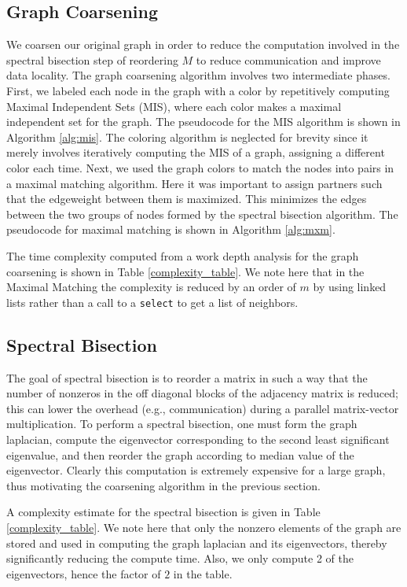 \documentclass[11pt]{article}
\begin{document}
\subsection{Graph Coarsening}

We coarsen our original graph in order to reduce the computation involved in
the spectral bisection step of reordering $M$ to reduce communication and improve data
locality.
The graph coarsening algorithm involves two intermediate phases. First, we
labeled each node in the graph with a color by repetitively computing Maximal
Independent Sets (MIS), where each color makes a maximal independent set for the
graph. The pseudocode for the MIS algorithm is shown in
Algorithm \ref{alg:mis}. The coloring algorithm is neglected for brevity since
it merely involves iteratively computing the MIS of a graph, assigning a
different color each time. Next, we used the
graph colors to match the nodes into pairs in a maximal matching algorithm. Here
it was important to assign partners such that the edgeweight between them is
maximized. This minimizes the edges between the two groups of nodes formed
by the spectral bisection algorithm. The pseudocode for maximal matching is
shown in Algorithm \ref{alg:mxm}. 

The time complexity computed from a work depth analysis for the graph coarsening is shown in Table
\ref{complexity_table}. We note here that in the Maximal Matching the
complexity is reduced by an order of $m$ by using linked lists rather than
a call to a \texttt{select} to get a list of neighbors. 

\subsection{Spectral Bisection}

The goal of spectral bisection is to reorder a matrix in such a way that the
number of nonzeros in the off diagonal blocks of the adjacency matrix is
reduced; this can lower the overhead (e.g., communication) during a parallel
matrix-vector multiplication. To perform a spectral bisection, one must form the
graph laplacian, compute the eigenvector corresponding to the second least significant
eigenvalue, and then reorder the graph according to median value of the
eigenvector. Clearly this computation is extremely expensive for a large
graph, thus motivating the coarsening algorithm in the previous section. 

A complexity estimate for the spectral bisection is given in Table
\ref{complexity_table}. We note here that only the nonzero elements of the graph
are stored and used in computing the graph laplacian and its eigenvectors, thereby significantly
reducing the compute time. Also, we only compute 2 of the eigenvectors, hence
the factor of $2$ in the table. 
\end{document}
